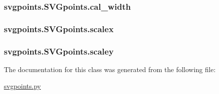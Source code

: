 \subsubsection[{cal\+\_\+width}]{\setlength{\rightskip}{0pt plus 5cm}svgpoints.\+S\+V\+Gpoints.\+cal\+\_\+width}\label{classsvgpoints_1_1_s_v_gpoints_a95e111b7ea626b3531bf219c2467fb78}
\hypertarget{classsvgpoints_1_1_s_v_gpoints_a037cce810ad33fdfdb41159f24d42ca0}{}
\subsubsection[{scalex}]{\setlength{\rightskip}{0pt plus 5cm}svgpoints.\+S\+V\+Gpoints.\+scalex}\label{classsvgpoints_1_1_s_v_gpoints_a037cce810ad33fdfdb41159f24d42ca0}
\hypertarget{classsvgpoints_1_1_s_v_gpoints_a3e0367d807f3527f3e58460118a33fad}{}
\subsubsection[{scaley}]{\setlength{\rightskip}{0pt plus 5cm}svgpoints.\+S\+V\+Gpoints.\+scaley}\label{classsvgpoints_1_1_s_v_gpoints_a3e0367d807f3527f3e58460118a33fad}


The documentation for this class was generated from the following file\+:\begin{DoxyCompactItemize}
\item 
\hyperlink{svgpoints_8py}{svgpoints.\+py}\end{DoxyCompactItemize}
